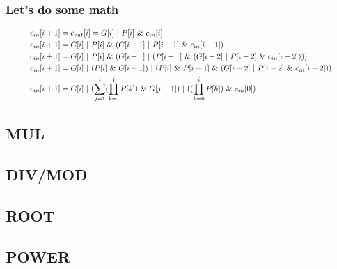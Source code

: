 \begin{frame}
    \frametitle{Let's do some math}
    \begin{equation}
        \resizebox{0.9\textwidth}{!}{%
            $
            \begin{aligned}
                &c_{in}[i+1]=c_{out}[i]=G[i] \ | \  P[i] \ \& \ c_{in}[i]\\
                &c_{in}[i+1]=G[i] \ | \  P[i] \ \& \ (G[i-1]  \ | \  P[i-1] \ \& \ c_{in}[i-1])\\
                &c_{in}[i+1]=G[i] \ | \  P[i] \ \& \ (G[i-1]  \ | \  (P[i-1] \ \& \ (G[i-2]  \ | \  P[i-2] \ \& \ c_{in}[i-2])))\\
                &c_{in}[i+1]=G[i] \ | \  (P[i] \ \& \ G[i-1])  \ | \  (P[i] \ \& \ P[i-1] \ \& \ (G[i-2]  \ | \  P[i-2] \ \& \ c_{in}[i-2]))\\
                &c_{in}[i+1]=G[i] \ | \  (\sum_{j=1}^{i} (\prod_{k=i}^{j} P[k]) \  \& \ G[j-1]) \ | \  ((\prod_{k=0}^{i} P[k]) \ \& \ c_{in}[0])\\
            \end{aligned}$%
        }
    \end{equation}
\end{frame}

\subsection{MUL}

\subsection{DIV/MOD}

\subsection{ROOT}

\subsection{POWER}

